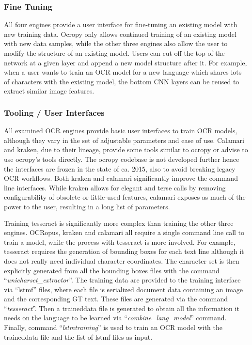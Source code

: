 \documentclass[sigconf]{acmart}
\begin{document}
\subsubsection{Fine Tuning}

All four engines provide a user interface for fine-tuning an
existing model with new training data. Ocropy only allows
continued training of an existing model with new data samples,
while the other three engines also allow the user to modify the
structure of an existing model. Users can cut off the top of the 
network at a given layer and append a new model structure after it.
For example, when a user wants to train an OCR model for a new
language which shares lots of characters with the existing model,
the bottom CNN layers can be reused to extract similar image features.

\subsubsection{Tooling / User Interfaces}

All examined OCR engines provide basic user interfaces to
train OCR models, although they vary in the set of adjustable
parameters and ease of use. Calamari and kraken, due to their lineage,
provide some tools similar to ocropy or advise to use ocropy's tools
directly. The ocropy codebase is not developed further hence the interfaces
are frozen in the state of ca. 2015, also to avoid breaking legacy OCR
workflows. Both kraken and calamari significantly improve the command
line interfaces. While kraken allows for elegant and terse calls by
removing configurability of obsolete or little-used features, calamari
exposes as much of the power to the user, resulting in a long list
of parameters.


Training tesseract is significantly more complex than training the other three engines. 
OCRopus, kraken and calamari all require a single command line call to train
a model, while the process with tesseract is more involved.
For example, tesseract requires the generation of bounding boxes for each text 
line although it does not really need individual character coordinates. 
The character set is then explicitly generated from all the bounding boxes files with the
command ``\textit{unicharset\_extractor}''. The training data are
provided to the training interface via ``lstmf'' files, where each
file is serialized document data containing an image and the
corresponding GT text. These files are generated via the
command ``\textit{tesseract}''. Then a traineddata file is generated
to obtain all the information it needs on the language to be
learned via ``\textit{combine\_lang\_model}'' command. Finally,
command ``\textit{lstmtraining}'' is used to train an OCR model with
the traineddata file and the list of lstmf files as input.
\end{document}
